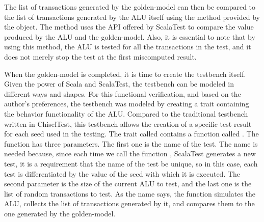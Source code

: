 

The list of transactions generated by the golden-model can then be compared to
the list of transactions generated by the ALU itself using the 
method provided by the  object. The  method
uses the API offered by ScalaTest to compare the value produced by the ALU and
the golden-model. Also, it is essential to note that by using this method, the
ALU is tested for all the transactions in the test, and it does not merely stop
the test at the first miscomputed result.


When the golden-model is completed, it is time to create the testbench itself.
Given the power of Scala and ScalaTest, the testbench can be modeled in
different ways and shapes. For this functional verification, and based on the
author's preferences, the testbench was modeled by creating a trait containing
the behavior functionality of the ALU. Compared to the traditional testbench
written in ChiselTest, this testbench allows the creation of a specific test
result for each seed used in the testing. The trait called 
contains a function called . The function has three parameters.
The first one is the name of the test. The name is needed because, since each
time we call the function , ScalaTest generates a new test, it is
a requirement that the name of the test be unique, so in this case, each test is
differentiated by the value of the seed with which it is executed. The second
parameter is the size of the current ALU to test, and the last one is the list
of random transactions to test. As the name says, the function simulates the
ALU, collects the list of transactions generated by it, and compares them to the
one generated by the golden-model.

